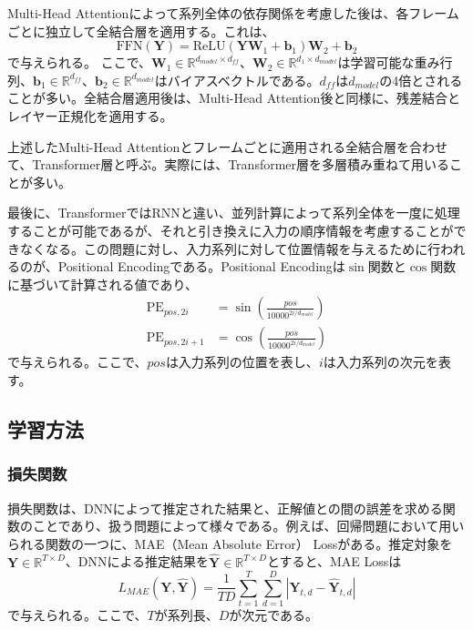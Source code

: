 \documentclass[12pt]{jarticle}
\numberwithin{equation}{section}    %
\numberwithin{figure}{section}      %
\numberwithin{table}{section}      %
\begin{document}
Multi-Head Attentionによって系列全体の依存関係を考慮した後は、各フレームごとに独立して全結合層を適用する。これは、
\begin{equation}
    \text{FFN}(\bm{Y}) = \text{ReLU}(\bm{Y}\bm{W}_{1} + \bm{b}_{1})\bm{W}_{2} + \bm{b}_{2}
\end{equation}
で与えられる。
ここで、$\bm{W}_{1} \in \mathbb{R}^{d_{model} \times d_{ff}}$、$\bm{W}_{2} \in \mathbb{R}^{d_{1} \times d_{model}}$は学習可能な重み行列、$\bm{b}_{1} \in \mathbb{R}^{d_{ff}}$、$\bm{b}_{2} \in \mathbb{R}^{d_{model}}$はバイアスベクトルである。$d_{ff}$は$d_{model}$の4倍とされることが多い。全結合層適用後は、Multi-Head Attention後と同様に、残差結合とレイヤー正規化を適用する。

上述したMulti-Head Attentionとフレームごとに適用される全結合層を合わせて、Transformer層と呼ぶ。実際には、Transformer層を多層積み重ねて用いることが多い。

最後に、TransformerではRNNと違い、並列計算によって系列全体を一度に処理することが可能であるが、それと引き換えに入力の順序情報を考慮することができなくなる。この問題に対し、入力系列に対して位置情報を与えるために行われるのが、Positional Encodingである。Positional Encodingは$\sin$関数と$\cos$関数に基づいて計算される値であり、
\begin{align}
    \text{PE}_{pos, 2i}     & = \sin \left(\frac{pos}{10000^{2i / d_{model}}}\right) \\
    \text{PE}_{pos, 2i + 1} & = \cos \left(\frac{pos}{10000^{2i / d_{model}}}\right)
\end{align}
で与えられる。ここで、$pos$は入力系列の位置を表し、$i$は入力系列の次元を表す。

\subsection{学習方法}
\subsubsection{損失関数}
損失関数は、DNNによって推定された結果と、正解値との間の誤差を求める関数のことであり、扱う問題によって様々である。例えば、回帰問題において用いられる関数の一つに、MAE（Mean Absolute Error） Lossがある。推定対象を$\bm{Y} \in \mathbb{R}^{T \times D}$、DNNによる推定結果を$\hat{\bm{Y}} \in \mathbb{R}^{T \times D}$とすると、MAE Lossは
\begin{equation}
    L_{MAE}(\bm{Y}, \hat{\bm{Y}}) = \frac{1}{TD} \sum_{t = 1}^{T} \sum_{d = 1}^{D}  |\bm{Y}_{t, d} - \hat{\bm{Y}}_{t, d}|
\end{equation}
で与えられる。ここで、$T$が系列長、$D$が次元である。
\end{document}
